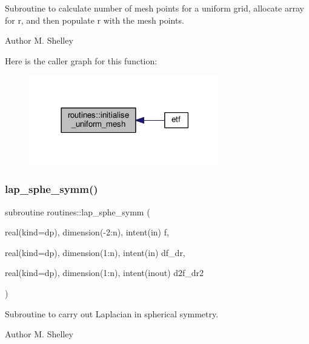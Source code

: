 Subroutine to calculate number of mesh points for a uniform grid, allocate array for r, and then populate r with the mesh points. 

\begin{DoxyAuthor}{Author}
M. Shelley 
\end{DoxyAuthor}
Here is the caller graph for this function\+:
\nopagebreak
\begin{figure}[H]
\begin{center}
\leavevmode
\includegraphics[width=237pt]{namespaceroutines_a5caa9b33bdf3c960b6bb3bfa96771181_icgraph}
\end{center}
\end{figure}
\mbox{\label{namespaceroutines_a635a2461a6c20207dd3b268842381ce3}} 
\subsubsection{\texorpdfstring{lap\+\_\+sphe\+\_\+symm()}{lap\_sphe\_symm()}}
{\footnotesize\ttfamily subroutine routines\+::lap\+\_\+sphe\+\_\+symm (\begin{DoxyParamCaption}\item[{real(kind=dp), dimension(-\/2\+:n), intent(in)}]{f,  }\item[{real(kind=dp), dimension(1\+:n), intent(in)}]{df\+\_\+dr,  }\item[{real(kind=dp), dimension(1\+:n), intent(inout)}]{d2f\+\_\+dr2 }\end{DoxyParamCaption})}



Subroutine to carry out Laplacian in spherical symmetry. 

\begin{DoxyAuthor}{Author}
M. Shelley 
\end{DoxyAuthor}

